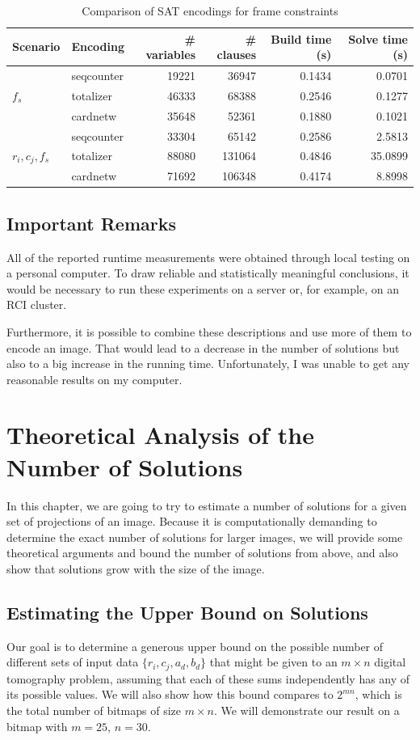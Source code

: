 \documentclass{report}
\begin{document}
\begin{table}[H]
\centering
\begin{tabular}{llrrrr}
\toprule
Scenario & Encoding & \# variables & \# clauses & Build time (s) & Solve time (s) \\
\midrule
\multirow{3}{*}{$f_s$}
 & seqcounter & 19221 & 36947 & 0.1434 & 0.0701 \\
 & totalizer  & 46333 & 68388 & 0.2546 & 0.1277 \\
 & cardnetw   & 35648 & 52361 & 0.1880 & 0.1021 \\
\midrule
\multirow{3}{*}{$r_i, c_j, f_s$}
 & seqcounter & 33304 & 65142 & 0.2586 & 2.5813 \\
 & totalizer  & 88080 & 131064 & 0.4846 & 35.0899 \\
 & cardnetw   & 71692 & 106348 & 0.4174 & 8.8998 \\
\bottomrule
\end{tabular}
\caption{Comparison of SAT encodings for frame constraints}
\label{tab:frames-encodings}
\end{table}

\section{Important Remarks}
All of the reported runtime measurements were obtained through local testing on a personal computer. To draw reliable and statistically meaningful conclusions, it would be necessary to run these experiments on a server or, for example, on an RCI cluster.

Furthermore, it is possible to combine these descriptions and use more of them to encode an image. That would lead to a decrease in the number of solutions but also to a big increase in the running time. Unfortunately, I was unable to get any reasonable results on my computer.

\chapter{Theoretical Analysis of the Number of Solutions}
In this chapter, we are going to try to estimate a number of solutions for a given set of projections of an image. Because it is computationally demanding to determine the exact number of solutions for larger images, we will provide some theoretical arguments and bound the number of solutions from above, and also show that solutions grow with the size of the image.
\section{Estimating the Upper Bound on Solutions}
Our goal is to determine a generous upper bound on the possible number of different sets of input data \(\{r_i, c_j, a_d, b_d\}\) that might be given to an \(m \times n\) digital tomography problem, assuming that each of these sums independently has any of its possible values. We will also show how this bound compares to \(2^{mn}\), which is the total number of bitmaps of size \(m \times n\). We will demonstrate our result on a bitmap with \(m = 25\), \(n = 30\).
\end{document}
